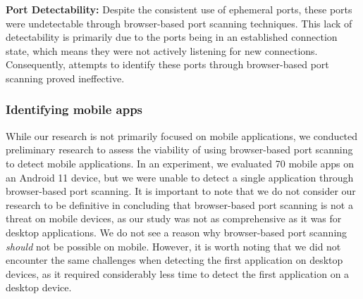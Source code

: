 \textbf{Port Detectability:} Despite the consistent use of ephemeral ports, these ports were undetectable through browser-based port scanning techniques. This lack of detectability is primarily due to the ports being in an established connection state, which means they were not actively listening for new connections. Consequently, attempts to identify these ports through browser-based port scanning proved ineffective.

\subsubsection{Identifying mobile apps}

While our research is not primarily focused on mobile applications, we conducted preliminary research to assess the viability of using browser-based port scanning to detect mobile applications. In an experiment, we evaluated 70 mobile apps on an Android 11 device, but we were unable to detect a single application through browser-based port scanning. 
It is important to note that we do not consider our research to be definitive in concluding that browser-based port scanning is not a threat on mobile devices, as our study was not as comprehensive as it was for desktop applications. We do not see a reason why browser-based port scanning \emph{should} not be possible on mobile. However, it is worth noting that we did not encounter the same challenges when detecting the first application on desktop devices, as it required considerably less time to detect the first application on a desktop device.




